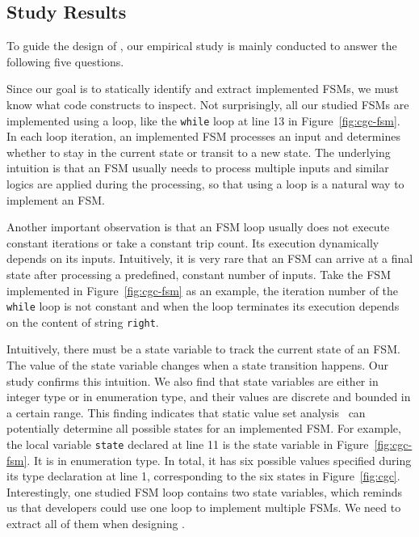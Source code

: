 


\subsection{Study Results}
To guide the design of \Tool{}, our empirical study
is mainly conducted to answer the following five questions. 



Since our goal is to statically identify and extract implemented FSMs,
we must know what code constructs to inspect.
Not surprisingly, all our studied FSMs are implemented using a loop,
like the \texttt{while} loop at line 13 in Figure~\ref{fig:cgc-fsm}.
In each loop iteration, an implemented FSM processes an input and
determines whether to stay in the current state or transit to a new state.
The underlying intuition is that an FSM usually needs to process
multiple inputs and similar logics are applied during the processing,
so that using a loop is a natural way to implement an FSM.

Another important observation is that
an FSM loop usually does not execute constant
iterations or take a constant trip count.
Its execution dynamically depends on its inputs. 
Intuitively, it is very rare that an FSM can arrive at a final
state after processing a predefined, constant number of inputs.
Take the FSM implemented in Figure~\ref{fig:cgc-fsm} as an example,
the iteration number of the \texttt{while} loop is not constant and
when the loop terminates its execution  
depends on the content of string \texttt{right}.

Intuitively, there must be a state variable to track the current state of an FSM.
The value of the state variable changes when a state transition happens.
Our study confirms this intuition.
We also find that state variables are either in integer type or in enumeration type,
and their values are discrete and bounded in a certain range.
This finding indicates that static value set analysis~\cite{DEEPVSA,VSA}
can potentially determine all possible states for an implemented FSM.
For example, the local variable \texttt{state} declared at line 11
is the state variable in Figure~\ref{fig:cgc-fsm}.
It is in enumeration type.
In total, it has six possible values
specified during its type declaration at line 1,
corresponding to the six states in Figure~\ref{fig:cgc}.
Interestingly, one studied FSM loop contains two state variables,
which reminds us that developers could use one loop
to implement multiple FSMs.
We need to extract all of them when designing \Tool{}.



